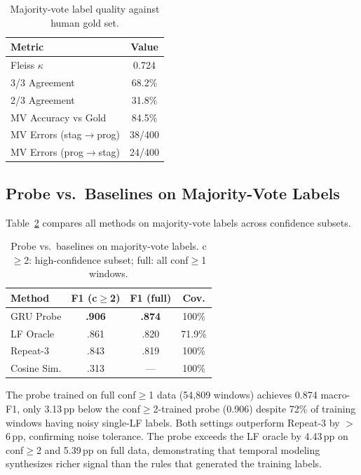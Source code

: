\documentclass[11pt,a4paper]{article}
\begin{document}
\begin{table}[t]
\centering
\small
\begin{tabular}{lc}
\toprule
\textbf{Metric} & \textbf{Value} \\
\midrule
Fleiss $\kappa$ & 0.724 \\
3/3 Agreement & 68.2\% \\
2/3 Agreement & 31.8\% \\
MV Accuracy vs Gold & 84.5\% \\
MV Errors (stag$\to$prog) & 38/400 \\
MV Errors (prog$\to$stag) & 24/400 \\
\bottomrule
\end{tabular}
\caption{Majority-vote label quality against human gold set.}
\label{tab:label-quality}
\end{table}

\subsection{Probe vs.\ Baselines on Majority-Vote Labels}

Table~\ref{tab:main} compares all methods on majority-vote labels across confidence subsets.

\begin{table}[t]
\centering
\small
\begin{tabular}{lccc}
\toprule
\textbf{Method} & \textbf{F1 (c$\geq$2)} & \textbf{F1 (full)} & \textbf{Cov.} \\
\midrule
GRU Probe & \textbf{.906} & \textbf{.874} & 100\% \\
LF Oracle & .861 & .820 & 71.9\% \\
Repeat-3 & .843 & .819 & 100\% \\
Cosine Sim. & .313 & --- & 100\% \\
\bottomrule
\end{tabular}
\caption{Probe vs.\ baselines on majority-vote labels. c$\geq$2: high-confidence subset; full: all conf$\geq$1 windows.}
\label{tab:main}
\end{table}

The probe trained on full conf$\geq$1 data (54,809 windows) achieves 0.874 macro-F1, only 3.13\,pp below the conf$\geq$2-trained probe (0.906) despite 72\% of training windows having noisy single-LF labels.
Both settings outperform Repeat-3 by $>$6\,pp, confirming noise tolerance.
The probe exceeds the LF oracle by 4.43\,pp on conf$\geq$2 and 5.39\,pp on full data, demonstrating that temporal modeling synthesizes richer signal than the rules that generated the training labels.
\end{document}
